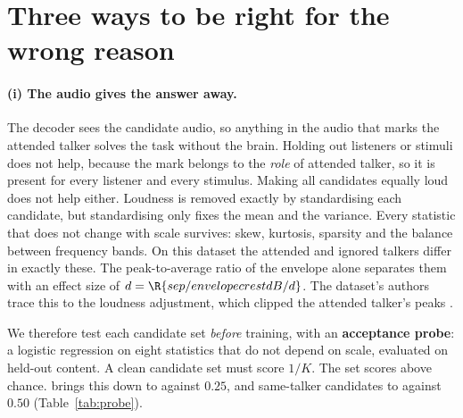 \section{Three ways to be right for the wrong reason}
\label{sec:failures}

\paragraph{(i) The audio gives the answer away.}
\label{sec:conf}
The decoder sees the candidate audio, so anything in the audio that marks the
attended talker solves the task without the brain. Holding out listeners or
stimuli does not help, because the mark belongs to the \emph{role} of attended
talker, so it is present for every listener and every stimulus. Making all
candidates equally loud does not help either. Loudness is removed exactly by
standardising each candidate, but standardising only fixes the mean and the
variance. Every statistic that does not change with scale survives: skew,
kurtosis, sparsity and the balance between frequency bands. On this dataset the
attended and ignored talkers differ in exactly these. The peak-to-average ratio of
the envelope alone separates them with an effect size of
$d=\R{sep/envelopecrestdB/d}$. The dataset's authors trace this to the loudness
adjustment, which clipped the attended talker's peaks \citep{maestro2026}.

We therefore test each candidate set \emph{before} training, with an
\textbf{acceptance probe}: a logistic regression on eight statistics that do not
depend on scale, evaluated on held-out content. A clean candidate set must score
$1/K$. The \cUnm{} set scores  above chance.
\cMat{} brings this down to  against $0.25$, and
same-talker candidates to  against $0.50$
(Table~\ref{tab:probe}).

